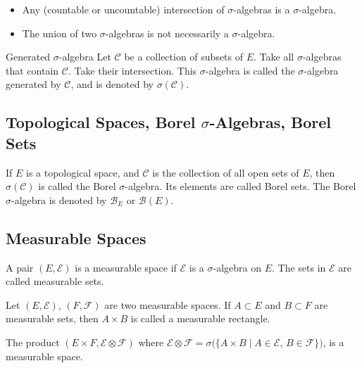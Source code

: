 \documentclass[english, course]{Notes}
\begin{document}
\begin{itemize}
	\item Any (countable or uncountable) intersection of $\sigma$-algebras is a $\sigma$-algebra.
	\item The union of two $\sigma$-algebras is not necessarily a $\sigma$-algebra.\\
\end{itemize}

\begin{definition}{Generated $\sigma$-algebra}
	Let $\mathcal{C}$ be a collection of subsets of $E$. Take all $\sigma$-algebras that contain $\mathcal{C}$. Take their intersection. This $\sigma$-algebra is called the $\sigma$-algebra generated by $\mathcal{C}$, and is denoted by $\sigma(\mathcal{C})$.
\end{definition}
\subsection{Topological Spaces, Borel $\sigma$-Algebras, Borel Sets}

\begin{definition}
	If $E$ is a topological space, and $\mathcal{C}$ is the collection of all open sets of $E$, then $\sigma (\mathcal{C})$ is called the Borel $\sigma$-algebra. Its elements are called Borel sets. The Borel $\sigma$-algebra is denoted by $\mathcal{B}_E$ or $\mathcal{B}(E)$.
\end{definition}

\subsection{Measurable Spaces}
\begin{definition}
A pair $(E, \mathcal{E})$ is a measurable space if $\mathcal{E}$ is a $\sigma$-algebra on $E$. The sets in $\mathcal{E}$ are called measurable sets.
\end{definition}

\begin{definition}
	Let $(E, \mathcal{E})$, $(F, \mathcal{F})$ are two measurable spaces. If $A \subset E$ and $B \subset F$ are measurable sets, then $A \times B$ is called a measurable rectangle.\\
\end{definition}

\begin{definition}
The product $(E \times F, \mathcal{E} \otimes \mathcal{F})$ where $\mathcal{E} \otimes \mathcal{F} = \sigma(\{A \times B \mid A \in \mathcal{E}$, $B \in \mathcal{F}\})$, is a measurable space.\\
\end{definition}
\end{document}
